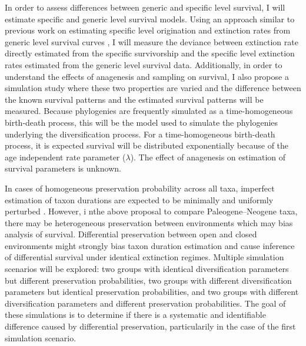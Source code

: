 \documentclass[12pt,letterpaper]{article}
\begin{document}
In order to assess differences between generic and specific level survival, I will estimate specific and generic level survival models. Using an approach similar to previous work on estimating specific level origination and extinction rates from generic level survival curves \citep{Foote1988}, I will measure the deviance between extinction rate directly estimated from the specific survivorship and the specific level extinction rates estimated from the generic level survival data. Additionally, in order to understand the effects of anagenesis and sampling on survival, I also propose a simulation study where these two properties are varied and the difference between the known survival patterns and the estimated survival patterns will be measured. Because phylogenies are frequently simulated as a time-homogeneous birth-death process, this will be the model used to simulate the phylogenies underlying the diversification process. For a time-homogeneous birth-death process, it is expected survival will be distributed exponentially because of the age independent rate parameter (\(\lambda\)). The effect of anagenesis on estimation of survival parameters is unknown.

In cases of homogeneous preservation probability across all taxa, imperfect estimation of taxon durations are expected to be minimally and uniformly perturbed \citep{Sepkoski1975}. However, i nthe above proposal to compare Paleogene--Neogene taxa, there may be heterogeneous preservation between environments which may bias analysis of survival. Differential preservation between open and closed environments might strongly bias taxon duration estimation and cause inference of differential survival under identical extinction regimes. Multiple simulation scenarios will be explored: two groups with identical diversification parameters but different preservation probabilities, two groups with different diversification parameters but identical preservation probabilities, and two groups with different diversification parameters and different preservation probabilities. The goal of these simulations is to determine if there is a systematic and identifiable difference caused by differential preservation, particularily in the case of the first simulation scenario.
\end{document}

